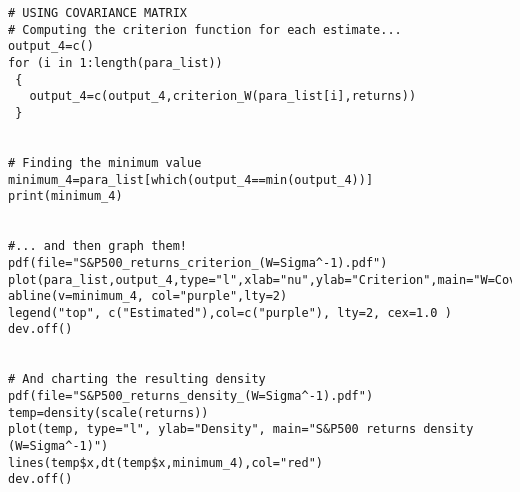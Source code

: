 \begin{appendices}
\begin{verbatim}
# USING COVARIANCE MATRIX
# Computing the criterion function for each estimate...
output_4=c()
for (i in 1:length(para_list))
 {
   output_4=c(output_4,criterion_W(para_list[i],returns))
 }


# Finding the minimum value
minimum_4=para_list[which(output_4==min(output_4))]
print(minimum_4)


#... and then graph them!
pdf(file="S&P500_returns_criterion_(W=Sigma^-1).pdf")
plot(para_list,output_4,type="l",xlab="nu",ylab="Criterion",main="W=Cov(x)")
abline(v=minimum_4, col="purple",lty=2)
legend("top", c("Estimated"),col=c("purple"), lty=2, cex=1.0 )
dev.off()


# And charting the resulting density
pdf(file="S&P500_returns_density_(W=Sigma^-1).pdf")
temp=density(scale(returns))
plot(temp, type="l", ylab="Density", main="S&P500 returns density (W=Sigma^-1)")
lines(temp$x,dt(temp$x,minimum_4),col="red")       
dev.off()



\end{verbatim}
\end{appendices}
